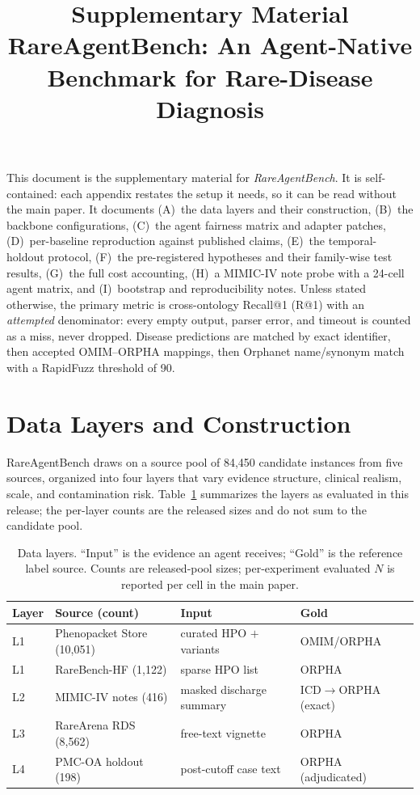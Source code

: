 \documentclass[letterpaper]{article} %
\title{Supplementary Material\\
RareAgentBench: An Agent-Native Benchmark for Rare-Disease Diagnosis}
\author{}
\begin{document}
\maketitle

\noindent
This document is the supplementary material for \emph{RareAgentBench}. It is
self-contained: each appendix restates the setup it needs, so it can be read
without the main paper. It documents (A)~the data layers and their construction,
(B)~the backbone configurations, (C)~the agent fairness matrix and adapter
patches, (D)~per-baseline reproduction against published claims,
(E)~the temporal-holdout protocol, (F)~the pre-registered hypotheses and their
family-wise test results, (G)~the full cost accounting, (H)~a
MIMIC-IV note probe with a 24-cell agent matrix, and (I)~bootstrap and
reproducibility notes. Unless stated otherwise, the primary metric is
cross-ontology Recall@1 (R@1) with an \emph{attempted} denominator: every empty
output, parser error, and timeout is counted as a miss, never dropped. Disease
predictions are matched by exact identifier, then accepted OMIM--ORPHA mappings,
then Orphanet name/synonym match with a RapidFuzz threshold of 90.

\section{Data Layers and Construction}
\label{app:data}

RareAgentBench draws on a source pool of 84,450 candidate instances from five
sources, organized into four layers that vary evidence structure, clinical
realism, scale, and contamination risk. Table~\ref{tab:datalayers} summarizes the
layers as evaluated in this release; the per-layer counts are the released sizes
and do not sum to the candidate pool.

\begin{table}[h]
\centering
\scriptsize
\setlength{\tabcolsep}{3.5pt}
\caption{Data layers. ``Input'' is the evidence an agent receives; ``Gold'' is
the reference label source. Counts are released-pool sizes; per-experiment
evaluated $N$ is reported per cell in the main paper.}
\label{tab:datalayers}
\begin{tabular}{@{}llll@{}}
\toprule
Layer & Source (count) & Input & Gold \\
\midrule
L1 & Phenopacket Store (10,051) & curated HPO $+$ variants & OMIM/ORPHA \\
L1 & RareBench-HF (1,122) & sparse HPO list & ORPHA \\
L2 & MIMIC-IV notes (416) & masked discharge summary & ICD$\rightarrow$ORPHA (exact) \\
L3 & RareArena RDS (8,562) & free-text vignette & ORPHA \\
L4 & PMC-OA holdout (198) & post-cutoff case text & ORPHA (adjudicated) \\
\bottomrule
\end{tabular}
\end{table}
\end{document}
